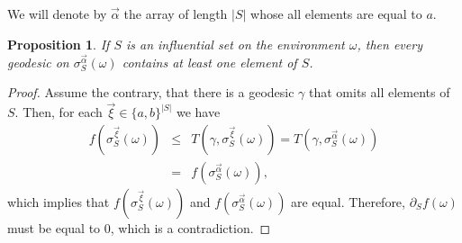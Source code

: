 \documentclass[reqno]{amsart}
\newtheorem{proposition}[theorem]{Proposition}
\begin{document}
We will denote by $\overrightarrow\alpha$ the array of length $|S|$ whose all elements are equal to $a$.

\begin{proposition}\label{thm|NonZeroDerivativeImpliesGeodesic}
If $S$ is an influential set on the environment $\omega$, then every geodesic on $\sigma_S^{\overrightarrow \alpha}(\omega)$ contains at least one element of $S$.
\end{proposition}
\begin{proof} Assume the contrary, that there is a geodesic $\gamma$ that omits all elements of $S$. Then, for each $\overrightarrow \xi\in\{a,b\}^{|S|}$ we have
\begin{eqnarray*}
f\left(\sigma^{\overrightarrow{\xi}}_S(\omega)\right)&\leq& T\left(\gamma,\sigma^{\overrightarrow{\xi}}_S(\omega)\right)
=
T\left(\gamma,\sigma^{\overrightarrow{\alpha}}_S(\omega)\right)\\
&=&f\left(\sigma^{\overrightarrow{\alpha}}_S(\omega)\right),
\end{eqnarray*}
which implies that $f\left(\sigma^{\overrightarrow{\xi}}_S(\omega)\right)$ and $f\left(\sigma^{\overrightarrow{\alpha}}_S(\omega)\right)$ are equal. Therefore, $\partial_Sf(\omega)$ must be equal to $0$, which is a contradiction.
\end{proof}
 
 
\end{document}
